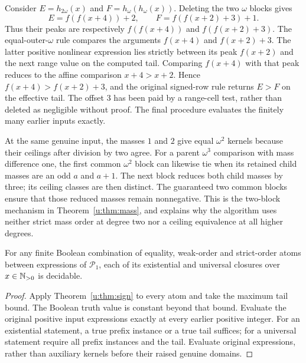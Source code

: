 \begin{example}
Consider $E=h_{2\omega}(x)$ and $F=h_\omega(h_\omega(x))$.
Deleting the two $\omega$ blocks gives
\[
 E=f(f(x+4))+2,\qquad F=f(f(x+2)+3)+1.
\]
Thus their peaks are respectively $f(f(x+4))$ and
$f(f(x+2)+3)$. The equal-outer-$\omega$ rule compares the arguments
$f(x+4)$ and $f(x+2)+3$. The latter positive nonlinear expression lies
strictly between its peak $f(x+2)$ and the next range value on the
computed tail. Comparing $f(x+4)$ with that peak reduces to the affine
comparison $x+4>x+2$. Hence $f(x+4)>f(x+2)+3$, and the original signed-row
rule returns $E>F$ on the effective tail. The offset $3$ has been paid
by a range-cell test, rather than deleted as negligible without proof.
The final procedure evaluates the finitely many earlier inputs exactly.
\end{example}

\begin{example}
At the same genuine input, the masses $1$ and $2$ give equal
$\omega^2$ kernels because their ceilings after division by two agree.
For a parent $\omega^3$ comparison with mass difference one, the first
common $\omega^2$ block can likewise tie when its retained child masses
are an odd $a$ and $a+1$. The next block reduces both child masses by
three; its ceiling classes are then distinct. The guaranteed two common
blocks ensure that those reduced masses remain nonnegative.
This is the two-block mechanism in
Theorem~\ref{u:thm:mass}, and explains why the algorithm uses neither strict
mass order at degree two nor a ceiling equivalence at all higher degrees.
\end{example}

\begin{corollary}\label{u:cor:boolean}
For any finite Boolean combination of equality, weak-order and strict-order
atoms between expressions of $\mathcal P_1$, each of its existential and
universal closures over $x\in\mathbb N_{>0}$ is decidable.
\end{corollary}
\begin{proof}
Apply Theorem~\ref{u:thm:sign} to every atom and take the maximum tail bound.
The Boolean truth value is constant beyond that bound. Evaluate the
original positive input expressions exactly at every earlier positive
integer. For an existential statement, a true prefix instance or a true
tail suffices; for a universal statement require all prefix instances and
the tail. Evaluate original expressions, rather than auxiliary kernels
before their raised genuine domains.
\end{proof}

